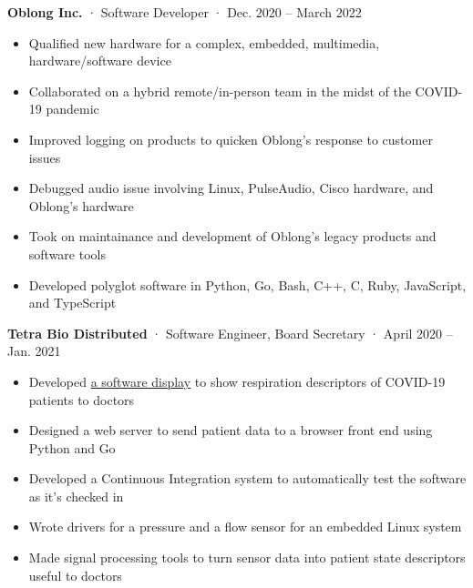 \documentclass[12pt, oneside]{article}
\newcommand{\jobtitle}[3] {
	{\bf #1} · {#2} · {#3} \vspace{-7pt} \\
}
\begin{document}
\begin{flushleft}
\jobtitle{Oblong Inc.}{Software Developer}{Dec. 2020 – March 2022}
\begin{itemize}
	\item Qualified new hardware for a complex, embedded, multimedia, hardware/software device \\
	\item Collaborated on a hybrid remote/in-person team in the midst of the COVID-19 pandemic \\
	\item Improved logging on products to quicken Oblong's response to customer issues \\
	\item Debugged audio issue involving Linux, PulseAudio, Cisco hardware, and Oblong's hardware \\
	\item Took on maintainance and development of Oblong's legacy products and  software tools \\
	\item Developed polyglot software in Python, Go, Bash, C++, C, Ruby, JavaScript, and TypeScript \\
\end{itemize}

\jobtitle{Tetra Bio Distributed}{Software Engineer, Board Secretary}{April 2020 – Jan. 2021}
\begin{itemize}
	\item Developed \href{https://github.com/tetrabiodistributed/project-tetra-display}{a software display} to show respiration descriptors of COVID-19 patients to doctors \\
	\item Designed a web server to send patient data to a browser front end using Python and Go \\
	\item Developed a Continuous Integration system to automatically test the software as it's checked in \\
	\item Wrote drivers for a pressure and a flow sensor for an embedded Linux system \\
	\item Made signal processing tools to turn sensor data into patient state descriptors useful to doctors \\
\end{itemize}


\end{flushleft}
\end{document}
